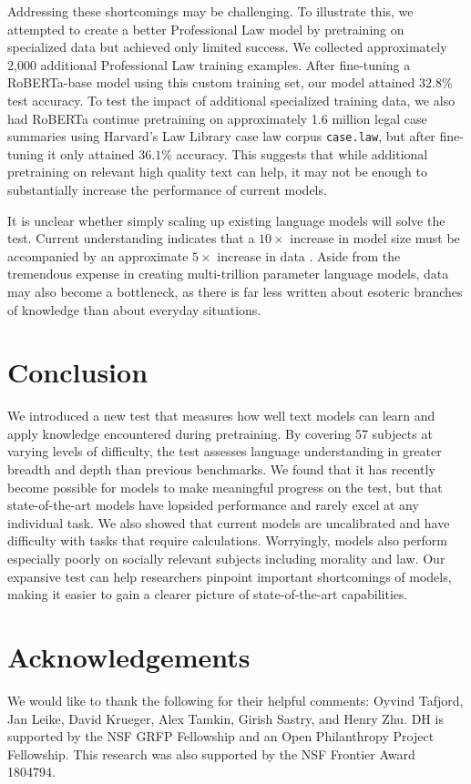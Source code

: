 \documentclass{article}
\begin{document}
Addressing these shortcomings may be challenging. To illustrate this, we attempted to create a better Professional Law model by pretraining on specialized data but achieved only limited success. We collected approximately 2,000 additional Professional Law training examples. After fine-tuning a RoBERTa-base model \citep{RobertaLiu2019AR} using this custom training set, our model attained $32.8\%$ test accuracy. To test the impact of additional specialized training data, we also had RoBERTa continue pretraining on approximately 1.6 million legal case summaries using Harvard’s Law Library case law corpus \texttt{case.law}, but after fine-tuning it only attained $36.1\%$ accuracy. This suggests that while additional pretraining on relevant high quality text can help, it may not be enough to substantially increase the performance of current models. 

It is unclear whether simply scaling up existing language models will solve the test. Current understanding indicates that a $10\times$ increase in model size must be accompanied by an approximate $5\times$ increase in data \citep{kaplan2020scalinglaws}. Aside from the tremendous expense in creating multi-trillion parameter language models, data may also become a bottleneck, as there is far less written about esoteric branches of knowledge than about everyday situations.

\section{Conclusion}

We introduced a new test that measures how well text models can learn and apply knowledge encountered during pretraining. By covering 57 subjects at varying levels of difficulty, the test assesses language understanding in greater breadth and depth than previous benchmarks.
We found that it has recently become possible for models to make meaningful progress on the test, but that state-of-the-art models have lopsided performance and rarely excel at any individual task. We also showed that current models are uncalibrated and have difficulty with tasks that require calculations. Worryingly, models also perform especially poorly on socially relevant subjects including morality and law.
Our expansive test can help researchers pinpoint important shortcomings of models, making it easier to gain a clearer picture of state-of-the-art capabilities.

\newpage
\section*{Acknowledgements}
We would like to thank the following for their helpful comments: Oyvind Tafjord, Jan Leike, David Krueger, Alex Tamkin, Girish Sastry, and Henry Zhu. DH is supported by the NSF GRFP Fellowship and an Open Philanthropy Project Fellowship. This research was also supported by the NSF Frontier Award 1804794.
\end{document}
